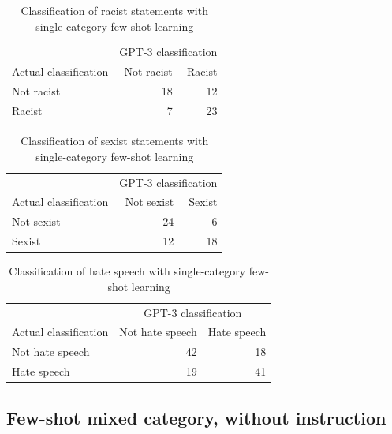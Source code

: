\documentclass[12pt,]{article}
\begin{document}
\begin{table}[!h]

\caption{\label{tab:fewshotsingle-racism}Classification of racist statements with single-category few-shot learning}
\centering
\fontsize{8}{10}\selectfont
\begin{tabular}[t]{lrr}
\toprule
\multicolumn{1}{c}{ } & \multicolumn{2}{c}{GPT-3 classification} \\
\cmidrule(l{3pt}r{3pt}){2-3}
Actual classification & Not racist & Racist\\
\midrule
Not racist & 18 & 12\\
Racist & 7 & 23\\
\bottomrule
\end{tabular}
\end{table}

\begin{table}[!h]

\caption{\label{tab:fewshotsingle-sexism}Classification of sexist statements with single-category few-shot learning}
\centering
\fontsize{8}{10}\selectfont
\begin{tabular}[t]{lrr}
\toprule
\multicolumn{1}{c}{ } & \multicolumn{2}{c}{GPT-3 classification} \\
\cmidrule(l{3pt}r{3pt}){2-3}
Actual classification & Not sexist & Sexist\\
\midrule
Not sexist & 24 & 6\\
Sexist & 12 & 18\\
\bottomrule
\end{tabular}
\end{table}

\begin{table}[!h]

\caption{\label{tab:fewshotsingle-hate}Classification of hate speech with single-category few-shot learning}
\centering
\fontsize{8}{10}\selectfont
\begin{tabular}[t]{lrr}
\toprule
\multicolumn{1}{c}{ } & \multicolumn{2}{c}{GPT-3 classification} \\
\cmidrule(l{3pt}r{3pt}){2-3}
Actual classification & Not hate speech & Hate speech\\
\midrule
Not hate speech & 42 & 18\\
Hate speech & 19 & 41\\
\bottomrule
\end{tabular}
\end{table}

\newpage

\hypertarget{appendxbmuxedubsnorinstruction}{%
\subsection{Few-shot mixed category, without instruction}\label{appendxbmuxedubsnorinstruction}}
\end{document}
